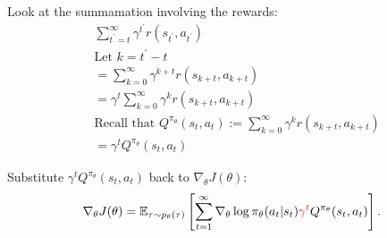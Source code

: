 Look at the summamation involving the rewards:
\begin{equation}
    \begin{aligned}
        & \sum_{t^\prime = t}^{\infty} \gamma^{t^\prime} r(s_{t^\prime}, a_{t^\prime}) \\
        & \text{Let $k = t^\prime - t$} \\
        & = \sum_{k=0}^{\infty} \gamma^{k+t} r(s_{k+t}, a_{k+t}) \\
        & = \gamma^t \sum_{k=0}^{\infty} \gamma^k r(s_{k+t}, a_{k+t}) \\
        & \text{Recall that $Q^{\pi_\theta}(s_t, a_t):= \sum_{k=0}^{\infty} \gamma^k r(s_{k+t}, a_{k+t})$} \\
        & = \gamma^t Q^{\pi_\theta}(s_t, a_t)
    \end{aligned}
\end{equation}

Substitute $ \gamma^t Q^{\pi_\theta}(s_t, a_t)$ back to $\nabla_\theta J(\theta)$:
\[
         \nabla_\theta J(\theta) = \mathbb{E}_{\tau \sim p_\theta(\tau)}\left[ \sum_{t=1}^{\infty} \nabla_\theta \log \pi_{\theta}(a_t | s_t)   \textcolor{red}{\gamma^t} Q^{\pi_\theta}(s_t, a_t)  \right].
\]

